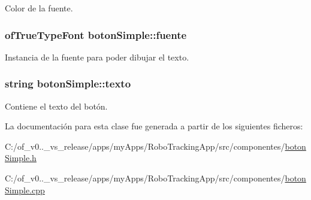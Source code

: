 Color de la fuente. 

\hypertarget{classboton_simple_aca3777162256e66600ed386b887e4414}{}
\subsubsection[{fuente}]{\setlength{\rightskip}{0pt plus 5cm}of\+True\+Type\+Font boton\+Simple\+::fuente\hspace{0.3cm}{\ttfamily [private]}}\label{classboton_simple_aca3777162256e66600ed386b887e4414}


Instancia de la fuente para poder dibujar el texto. 

\hypertarget{classboton_simple_a6093d1fa34187d1f74182f59de6459b9}{}
\subsubsection[{texto}]{\setlength{\rightskip}{0pt plus 5cm}string boton\+Simple\+::texto\hspace{0.3cm}{\ttfamily [private]}}\label{classboton_simple_a6093d1fa34187d1f74182f59de6459b9}


Contiene el texto del botón. 



La documentación para esta clase fue generada a partir de los siguientes ficheros\+:\begin{DoxyCompactItemize}
\item 
C\+:/of\+\_\+v0..\+\_\+vs\+\_\+release/apps/my\+Apps/\+Robo\+Tracking\+App/src/componentes/\hyperlink{boton_simple_8h}{boton\+Simple.\+h}\item 
C\+:/of\+\_\+v0..\+\_\+vs\+\_\+release/apps/my\+Apps/\+Robo\+Tracking\+App/src/componentes/\hyperlink{boton_simple_8cpp}{boton\+Simple.\+cpp}\end{DoxyCompactItemize}
